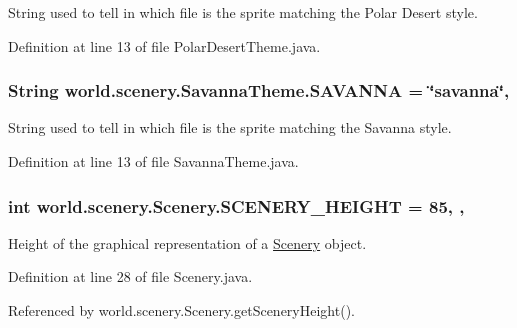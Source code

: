 String used to tell in which file is the sprite matching the Polar Desert style. 



Definition at line 13 of file Polar\-Desert\-Theme.\-java.

\hypertarget{a00023_a69e8a9867db3a93074a41573940424b2}{
\subsubsection[{S\-A\-V\-A\-N\-N\-A}]{\setlength{\rightskip}{0pt plus 5cm}String world.\-scenery.\-Savanna\-Theme.\-S\-A\-V\-A\-N\-N\-A = \char`\"{}savanna\char`\"{}\hspace{0.3cm}{\ttfamily [static]}, {\ttfamily [inherited]}}}\label{a00023_a69e8a9867db3a93074a41573940424b2}


String used to tell in which file is the sprite matching the Savanna style. 



Definition at line 13 of file Savanna\-Theme.\-java.

\hypertarget{a00024_a106e53ae6e1647395740237ccce7f363}{
\subsubsection[{S\-C\-E\-N\-E\-R\-Y\-\_\-\-H\-E\-I\-G\-H\-T}]{\setlength{\rightskip}{0pt plus 5cm}int world.\-scenery.\-Scenery.\-S\-C\-E\-N\-E\-R\-Y\-\_\-\-H\-E\-I\-G\-H\-T = 85\hspace{0.3cm}{\ttfamily [static]}, {\ttfamily [protected]}, {\ttfamily [inherited]}}}\label{a00024_a106e53ae6e1647395740237ccce7f363}


Height of the graphical representation of a \hyperlink{a00024}{Scenery} object. 



Definition at line 28 of file Scenery.\-java.



Referenced by world.\-scenery.\-Scenery.\-get\-Scenery\-Height().

